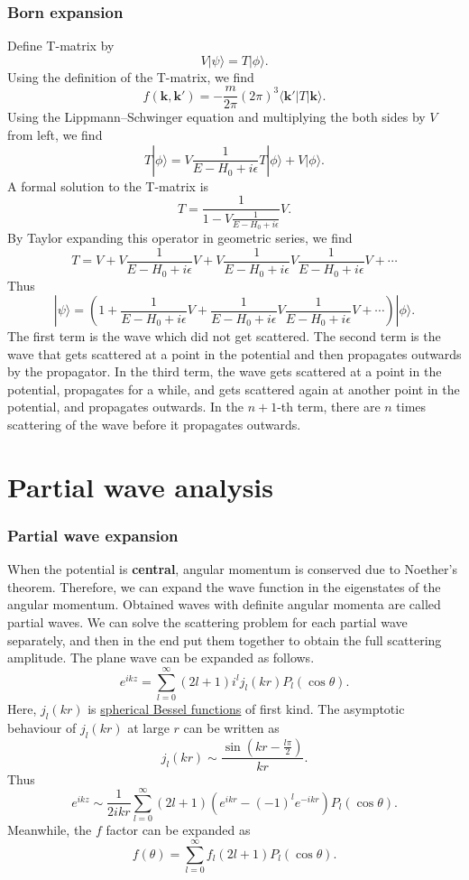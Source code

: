 \subsubsection{Born expansion}
\noindent
Define T-matrix by
\[V | \psi \rangle = T |\phi\rangle.\]
Using the definition of the T-matrix, we find
\[f(\bm{k},\bm{k}') = - \frac{m}{2\pi} (2\pi)^3  \langle \bm{k}'| T | \bm{k}\rangle .\]
Using the Lippmann–Schwinger equation and multiplying the
both sides by $V$ from left, we find
\[ T |\phi\rangle = V \frac{1}{E-H_0 + i\epsilon}T|\phi\rangle + V|\phi\rangle.\]
A formal solution to the T-matrix is
\[T = \frac{1}{1-V\frac{1}{E-H_0 + i\epsilon}}V.\]
By Taylor expanding this operator in geometric series, we find
\[T = V + V \frac{1}{E-H_0 + i\epsilon} V + V \frac{1}{E-H_0 + i\epsilon} V \frac{1}{E-H_0 + i\epsilon} V + \cdots\]
Thus
\[|\psi\rangle = \left( 1 +  \frac{1}{E-H_0 + i\epsilon} V +  \frac{1}{E-H_0 + i\epsilon} V \frac{1}{E-H_0 + i\epsilon} V + \cdots \right) | \phi \rangle.\]
The first term is the wave which did not get scattered.
The second term is the wave that gets scattered at a point in the potential and then propagates outwards by the propagator. 
In the third term, the wave gets scattered at a point in the potential, propagates for a while, and gets scattered again at another point in the potential, and propagates outwards. 
In the $n+1$-th term, there are $n$ times scattering of the wave before it propagates outwards.

\section{Partial wave analysis}
\subsubsection{Partial wave expansion}
When the potential is \textbf{central}, angular momentum is conserved due to Noether's theorem. Therefore, we can expand the wave function in the eigenstates of the angular momentum. Obtained waves with definite angular momenta are called partial waves. We can solve the scattering problem for each partial wave separately, and then in the end put them together to obtain the full scattering amplitude.
The plane wave can be expanded as follows.
\[e^{ikz} = \sum_{l=0}^{\infty}(2l+1)i^l j_l(kr) P_l(\cos \theta).\]
Here, $j_l(kr)$ is \href{https://en.wikipedia.org/wiki/Bessel_function#Spherical_Bessel_functions:_jn.2C_yn}{spherical Bessel functions} of first kind. The asymptotic behaviour of $j_l(kr)$ at large $r$ can be written as
\[j_l(kr) \sim \frac{\sin(kr-\frac{l\pi}{2})}{kr}.\]
Thus
\[e^{ikz} \sim \frac{1}{2ikr} \sum_{l=0}^{\infty} (2l+1) (e^{ikr} - (-1)^l e^{-ikr})P_l(\cos \theta).\]
Meanwhile, the $f$ factor can be expanded as
\[f(\theta) = \sum_{l=0}^{\infty} f_l (2l+1)P_l(\cos \theta).\]

